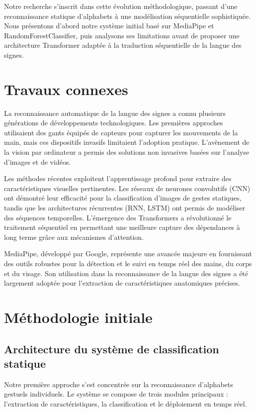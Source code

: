 \documentclass[twocolumn]{el-author}
\begin{document}
Notre recherche s'inscrit dans cette évolution méthodologique, passant d'une reconnaissance statique d'alphabets à une modélisation séquentielle sophistiquée. Nous présentons d'abord notre système initial basé sur MediaPipe et RandomForestClassifier, puis analysons ses limitations avant de proposer une architecture Transformer adaptée à la traduction séquentielle de la langue des signes.

\section{Travaux connexes}

La reconnaissance automatique de la langue des signes a connu plusieurs générations de développements technologiques. Les premières approches utilisaient des gants équipés de capteurs pour capturer les mouvements de la main, mais ces dispositifs invasifs limitaient l'adoption pratique. L'avènement de la vision par ordinateur a permis des solutions non invasives basées sur l'analyse d'images et de vidéos.

Les méthodes récentes exploitent l'apprentissage profond pour extraire des caractéristiques visuelles pertinentes. Les réseaux de neurones convolutifs (CNN) ont démontré leur efficacité pour la classification d'images de gestes statiques, tandis que les architectures récurrentes (RNN, LSTM) ont permis de modéliser des séquences temporelles. L'émergence des Transformers a révolutionné le traitement séquentiel en permettant une meilleure capture des dépendances à long terme grâce aux mécanismes d'attention.

MediaPipe, développé par Google, représente une avancée majeure en fournissant des outils robustes pour la détection et le suivi en temps réel des mains, du corps et du visage. Son utilisation dans la reconnaissance de la langue des signes a été largement adoptée pour l'extraction de caractéristiques anatomiques précises.

\section{Méthodologie initiale}

\subsection{Architecture du système de classification statique}

Notre première approche s'est concentrée sur la reconnaissance d'alphabets gestuels individuels. Le système se compose de trois modules principaux : l'extraction de caractéristiques, la classification et le déploiement en temps réel.
\end{document}
